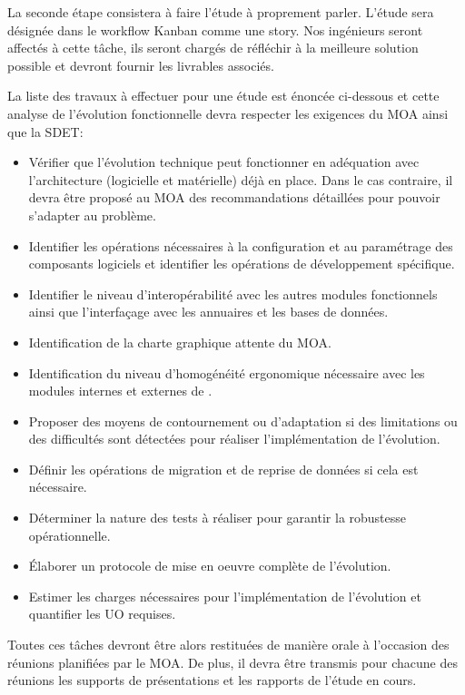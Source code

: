	La seconde étape consistera à faire l’étude à proprement parler. L’étude sera désignée dans le workflow Kanban comme une story. Nos ingénieurs seront affectés à cette tâche, ils seront chargés de réfléchir à la meilleure solution possible et devront fournir les livrables associés. 
	
	La liste des travaux à effectuer pour une étude est énoncée ci-dessous et cette analyse de l’évolution fonctionnelle devra respecter les exigences du MOA ainsi que la SDET:
	
	\begin{itemize}
		\item Vérifier que l’évolution technique peut fonctionner en adéquation avec l’architecture (logicielle et matérielle) déjà en place. Dans le cas contraire, il devra être proposé au MOA des recommandations détaillées pour pouvoir s’adapter au problème.
		\item Identifier les opérations nécessaires à la configuration et au paramétrage des composants logiciels et identifier les opérations de développement spécifique.
		\item Identifier le niveau d’interopérabilité avec les autres modules fonctionnels ainsi que l’interfaçage avec les annuaires et les bases de données.
		\item Identification de la charte graphique attente du MOA.			
		\item Identification du niveau d’homogénéité ergonomique nécessaire avec les modules  internes et externes de \correlyce{}.
		\item Proposer des moyens de contournement ou d’adaptation si des limitations ou des difficultés sont détectées pour réaliser l’implémentation de l’évolution.
		\item Définir les opérations de migration et de reprise de données si cela est nécessaire.
		\item Déterminer la nature des tests à réaliser pour garantir la robustesse opérationnelle.
		\item Élaborer un protocole de mise en oeuvre complète de l’évolution.
		\item Estimer les charges nécessaires pour l’implémentation de l’évolution et quantifier les UO requises.
		\end{itemize}
		
	Toutes ces tâches devront être alors restituées de manière orale à l’occasion des réunions planifiées par le MOA. De plus, il devra être transmis pour chacune des réunions les supports de présentations et les rapports de l’étude en cours.
	
